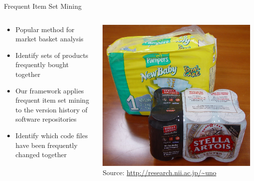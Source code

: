 \begin{frame}{Frequent Item Set Mining}
  \begin{columns}[c]
    \begin{column}{0.5\textwidth}
      \begin{itemize}
      \item Popular method for market basket analysis
      \item Identify sets of products frequently bought together
      \item Our framework applies frequent item set mining to the
        version history of software repositories
      \item Identify which code files have been frequently changed
        together
      \end{itemize}
    \end{column}
    \begin{column}{0.5\textwidth}
      \begin{center}
        \includegraphics[width=\textwidth]{figures/frequent-item-set} \\
        \tiny{Source: \url{http://research.nii.ac.jp/~uno}}
      \end{center}
    \end{column}
  \end{columns}
\end{frame}


